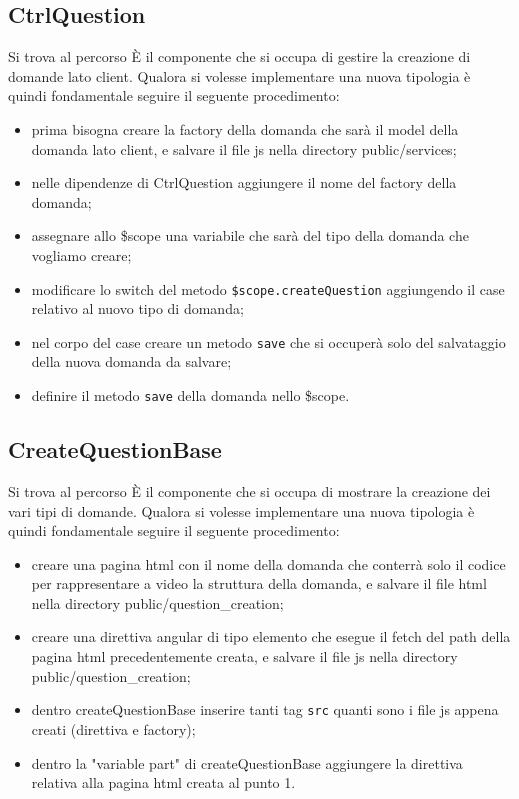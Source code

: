 \documentclass[a4paper, titlepage]{article}
\begin{document}
	\subsection{CtrlQuestion}
	Si trova al percorso  
	È il componente che si occupa di gestire la creazione di domande lato client.
	Qualora si volesse implementare una nuova tipologia è quindi fondamentale seguire il seguente procedimento:
	\begin{itemize}
		\item prima bisogna creare la factory della domanda che sarà il model della domanda lato client, e salvare il file js nella directory public/services;
		\item nelle dipendenze di CtrlQuestion aggiungere il nome del factory della domanda;
		\item assegnare allo \$scope una variabile che sarà del tipo della domanda che vogliamo creare;
		\item modificare lo switch del metodo \texttt{\$scope.createQuestion} aggiungendo il case relativo al nuovo tipo di domanda;
		\item nel corpo del case creare un metodo \texttt{save} che si occuperà solo del salvataggio della nuova domanda da salvare;
		\item definire il metodo \texttt{save} della domanda nello \$scope.
	\end{itemize}
	
	\subsection{CreateQuestionBase}
	Si trova al percorso 
	È il componente che si occupa di mostrare la creazione dei vari tipi di domande.
	Qualora si volesse implementare una nuova tipologia è quindi fondamentale seguire il seguente procedimento:
	\begin{itemize}
		\item creare una pagina html con il nome della domanda che conterrà solo il codice per rappresentare a video la struttura della domanda, e salvare il file html nella directory public/question\_creation;
		\item creare una direttiva angular di tipo elemento che esegue il fetch del path della pagina html precedentemente creata, e salvare il file js nella directory public/question\_creation;
		\item dentro createQuestionBase inserire tanti tag \texttt{src} quanti sono i file js appena creati (direttiva e factory);
		\item dentro la "variable part" di createQuestionBase aggiungere la direttiva relativa alla pagina html creata al punto 1.
	\end{itemize}
	
\end{document}
